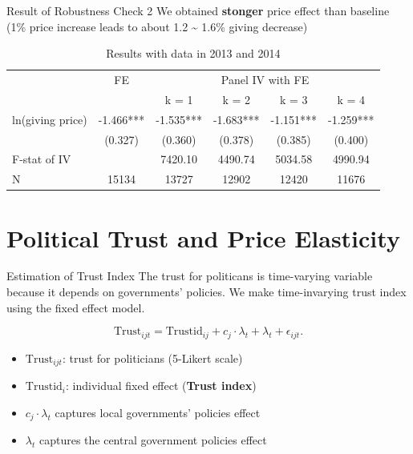 \documentclass[
  ignorenonframetext,
]{beamer}
\providecommand{\tightlist}{%
  \setlength{\itemsep}{0pt}\setlength{\parskip}{0pt}}
\begin{document}
\begin{frame}{Result of Robustness Check 2}
\protect\hypertarget{result-of-robustness-check-2}{}
We obtained \textbf{stonger} price effect than baseline (1\% price increase leads to about 1.2 \textasciitilde{} 1.6\% giving decrease)

\begin{table}

\caption{\label{tab:kableRobust2EstimateElasticity}Results with data in 2013 and 2014}
\centering
\fontsize{9}{11}\selectfont
\begin{tabular}[t]{lccccc}
\toprule
\multicolumn{1}{c}{ } & \multicolumn{1}{c}{FE} & \multicolumn{4}{c}{Panel IV with FE} \\
\cmidrule(l{3pt}r{3pt}){2-2} \cmidrule(l{3pt}r{3pt}){3-6}
 &  & k = 1 & k = 2 & k = 3 & k = 4\\
\midrule
ln(giving price) & -1.466*** & -1.535*** & -1.683*** & -1.151*** & -1.259***\\
 & (0.327) & (0.360) & (0.378) & (0.385) & (0.400)\\
F-stat of IV &  & 7420.10 & 4490.74 & 5034.58 & 4990.94\\
N & 15134 & 13727 & 12902 & 12420 & 11676\\
\bottomrule
\end{tabular}
\end{table}
\end{frame}

\hypertarget{political-trust-and-price-elasticity}{%
\section{Political Trust and Price Elasticity}\label{political-trust-and-price-elasticity}}

\begin{frame}{Estimation of Trust Index}
\protect\hypertarget{estimation-of-trust-index}{}
The trust for politicans is time-varying variable because it depends on governments' policies.
We make time-invarying trust index using the fixed effect model.

\[
    \text{Trust}_{ijt} = \text{Trustid}_{ij} + c_j \cdot \lambda_t + \lambda_t + \epsilon_{ijt}.
\]

\begin{itemize}
\tightlist
\item
  \(\text{Trust}_{ijt}\): trust for politicians (5-Likert scale)
\item
  \(\text{Trustid}_i\): individual fixed effect (\textbf{Trust index})
\item
  \(c_j \cdot \lambda_t\) captures local governments' policies effect
\item
  \(\lambda_t\) captures the central government policies effect
\end{itemize}
\end{frame}
\end{document}
